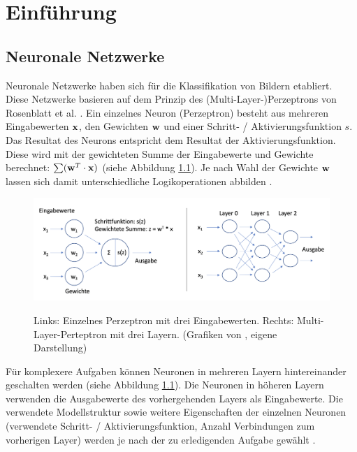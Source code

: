 \documentclass{FFHS_Thesis_Additions/ffhsthesis}
\begin{document}
\chapter{Einführung}
\label{c_einfuehrung}


\section{Neuronale Netzwerke}

Neuronale Netzwerke haben sich für die Klassifikation von Bildern etabliert. 
Diese Netzwerke basieren auf dem Prinzip des (Multi-Layer-)Perzeptrons von Rosenblatt et al. \cite{rosenblatt_perceptron_1957}. 
Ein einzelnes Neuron (Perzeptron) besteht aus mehreren Eingabewerten $\bold{x}$, den Gewichten $\bold{w}$ und einer Schritt- / Aktivierungsfunktion $s$. 
Das Resultat des Neurons entspricht dem Resultat der Aktivierungsfunktion. 
Diese wird mit der gewichteten Summe der Eingabewerte und Gewichte berechnet: $\sum(\bold{w}^T \cdot \bold{x})$ (siehe Abbildung \ref{fig_perzeptron}). 
Je nach Wahl der Gewichte $\bold{w}$ lassen sich damit unterschiedliche Logikoperationen abbilden \cite{aurelien_geron_hands-machine_2017}. 


\begin{figure}[h]
\caption{Links: Einzelnes Perzeptron mit drei Eingabewerten. Rechts: Multi-Layer-Perteptron mit drei Layern. (Grafiken von \cite{aurelien_geron_hands-machine_2017}, eigene Darstellung)}
\centering
\includegraphics[width=\textwidth]{./images/perzeptron}
\label{fig_perzeptron}
\end{figure}

Für komplexere Aufgaben können Neuronen in mehreren Layern hintereinander geschalten werden (siehe Abbildung \ref{fig_perzeptron}). 
Die Neuronen in höheren Layern verwenden die Ausgabewerte des vorhergehenden Layers als Eingabewerte.
Die verwendete Modellstruktur sowie weitere Eigenschaften der einzelnen Neuronen (verwendete Schritt- / Aktivierungsfunktion, Anzahl Verbindungen zum vorherigen Layer) werden je nach der zu erledigenden Aufgabe gewählt \cite{francois_chollet_deep_nodate}.
\end{document}
